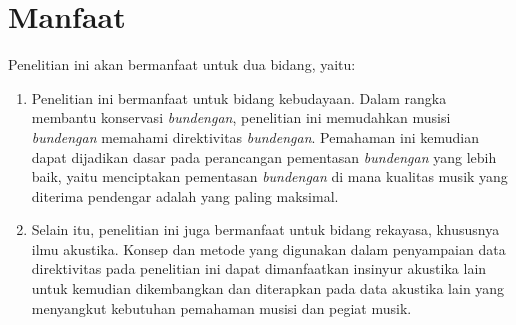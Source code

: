 \section{Manfaat}
Penelitian ini akan bermanfaat untuk dua bidang, yaitu: \par 
\begin{enumerate}
    \item Penelitian ini bermanfaat untuk bidang kebudayaan. Dalam rangka membantu konservasi \textit{bundengan}, penelitian ini memudahkan musisi \textit{bundengan} memahami direktivitas \textit{bundengan}. Pemahaman ini kemudian dapat dijadikan dasar pada perancangan pementasan \textit{bundengan} yang lebih baik, yaitu menciptakan pementasan \textit{bundengan} di mana kualitas musik yang diterima pendengar adalah yang paling maksimal.
    \item Selain itu, penelitian ini juga bermanfaat untuk bidang rekayasa, khususnya ilmu akustika. Konsep dan metode yang digunakan dalam penyampaian data direktivitas pada penelitian ini dapat dimanfaatkan insinyur akustika lain untuk kemudian dikembangkan dan diterapkan pada data akustika lain yang menyangkut kebutuhan pemahaman musisi dan pegiat musik. 
\end{enumerate}